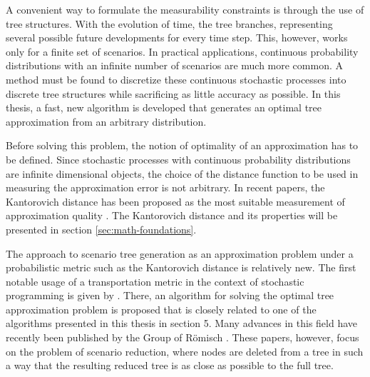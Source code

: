 A convenient way to formulate the measurability constraints is through the use of tree structures.
With the evolution of time, the tree branches, representing several possible future developments for every time step.
This, however, works only for a finite set of scenarios.
In practical applications, continuous probability distributions with an infinite number of scenarios are much more common.
A method must be found to discretize these continuous stochastic processes into discrete tree structures while sacrificing as little accuracy as possible.
In this thesis, a fast, new algorithm is developed that generates an optimal tree approximation from an arbitrary distribution.

Before solving this problem, the notion of optimality of an approximation has to be defined.
Since stochastic processes with continuous probability distributions are infinite dimensional objects, the choice of the distance function to be used in measuring the approximation error is not arbitrary.
In recent papers, the Kantorovich distance has been proposed as the most suitable measurement of approximation quality \citep{Dupacova2003,Heitsch2003,Heitsch2009,Heitsch2009a,Heitsch2010}.
The Kantorovich distance and its properties will be presented in section \ref{sec:math-foundations}.

The approach to scenario tree generation as an approximation problem under a probabilistic metric such as the Kantorovich distance is relatively new.
The first notable usage of a transportation metric in the context of stochastic programming is given by \citet{Pflug2001}.
There, an algorithm for solving the optimal tree approximation problem is proposed that is closely related to one of the algorithms presented in this thesis in section 5.
Many advances in this field have recently been published by the Group of R\"{o}misch \citep{Dupacova2003,Heitsch2003,Heitsch2009,Heitsch2009a,Heitsch2010}.
These papers, however, focus on the problem of scenario reduction, where nodes are deleted from a tree in such a way that the resulting reduced tree is as close as possible to the full tree.

